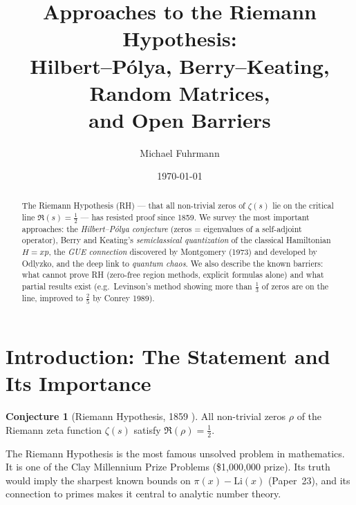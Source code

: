 \documentclass[12pt,a4paper]{amsart}
\theoremstyle{definition}
\newtheorem{conjecture}[theorem]{Conjecture}
\newcommand{\Li}{\mathrm{Li}}
\begin{document}

\title{Approaches to the Riemann Hypothesis:\\
       Hilbert--P\'olya, Berry--Keating, Random Matrices,\\
       and Open Barriers}

\author{Michael Fuhrmann}
\address{Specialist Mathematics Project, Build 84}
\date{\today}

\begin{abstract}
The Riemann Hypothesis (RH) --- that all non-trivial zeros of $\zeta(s)$
lie on the critical line $\Re(s) = \tfrac{1}{2}$ --- has resisted proof
since 1859.  We survey the most important approaches:
the \emph{Hilbert--P\'olya conjecture} (zeros = eigenvalues of a self-adjoint
operator), Berry and Keating's \emph{semiclassical quantization} of the
classical Hamiltonian $H = xp$, the \emph{GUE connection} discovered by
Montgomery (1973) and developed by Odlyzko,
and the deep link to \emph{quantum chaos}.
We also describe the known barriers: what cannot prove RH (zero-free region
methods, explicit formulas alone) and what partial results exist
(e.g.\ Levinson's method showing more than $\tfrac{1}{3}$ of zeros are on the line,
improved to $\tfrac{2}{5}$ by Conrey 1989).
\end{abstract}

\maketitle
\tableofcontents

\section{Introduction: The Statement and Its Importance}

\begin{conjecture}[Riemann Hypothesis, 1859 \cite{Riemann1859}]
\label{conj:rh}
All non-trivial zeros $\rho$ of the Riemann zeta function $\zeta(s)$
satisfy $\Re(\rho) = \tfrac{1}{2}$.
\end{conjecture}

The Riemann Hypothesis is the most famous unsolved problem in mathematics.
It is one of the Clay Millennium Prize Problems (\$1,000,000 prize).
Its truth would imply the sharpest known bounds on $\pi(x) - \Li(x)$
(Paper~23), and its connection to primes makes it central to analytic
number theory.
\end{document}
